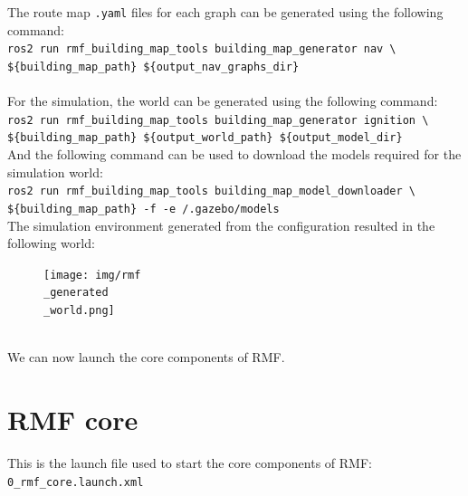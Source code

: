 The route map \texttt{.yaml} files for each graph can be generated using the following command:\\
\texttt{ros2 run rmf\_building\_map\_tools building\_map\_generator nav \textbackslash \\ \hspace*{1cm} \$\{building\_map\_path\} \$\{output\_nav\_graphs\_dir\}}\\
\vspace*{5mm}\\
For the simulation, the world can be generated using the following command:\\
\texttt{ros2 run rmf\_building\_map\_tools building\_map\_generator ignition \textbackslash{}\\ \hspace*{1cm}
\$\{building\_map\_path\} \$\{output\_world\_path\} \$\{output\_model\_dir\}}\\
And the following command can be used to download the models required for the simulation world:\\
\texttt{ros2 run rmf\_building\_map\_tools building\_map\_model\_downloader \textbackslash{} \\ \hspace*{1cm}
\$\{building\_map\_path\} -f -e \mytexttilde/.gazebo/models}\\

\newpage
The simulation environment generated from the configuration resulted in the following world:\\
\begin{figure}[h]
	\centering
	\texttt{[image: img/rmf\\\_generated\\\_world.png]}
\end{figure}\\

We can now launch the core components of RMF.

\section{RMF core}
This is the launch file used to start the core components of RMF:\\
\texttt{0\_rmf\_core.launch.xml}\\

